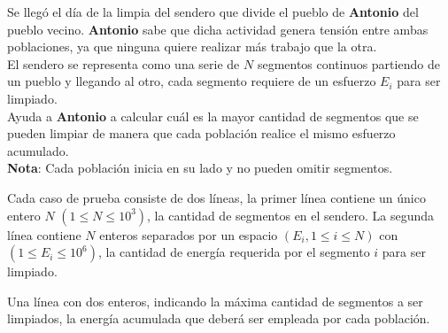 
Se llegó el día de la limpia del sendero que divide el pueblo de \textbf{Antonio} del pueblo vecino. \textbf{Antonio} sabe que dicha actividad genera tensión entre ambas poblaciones, ya que ninguna quiere realizar más trabajo que la otra.
\\
El sendero se representa como una serie de $N$ segmentos continuos partiendo de un pueblo y llegando al otro, cada segmento requiere de un esfuerzo $E_i$ para ser limpiado.
\\
Ayuda a \textbf{Antonio} a calcular cuál es la mayor cantidad de segmentos que se pueden limpiar de manera que cada población realice el mismo esfuerzo acumulado.
\\

\textbf{Nota}: 
Cada población inicia en su lado y no pueden omitir segmentos.


Cada caso de prueba consiste de dos líneas, la primer línea contiene un único entero $N$ $(1 \le N \le 10^3)$, la cantidad de segmentos en el sendero. La segunda línea contiene $N$ enteros separados por un espacio $(E_i, 1\le i \le N)$  con $(1 \le E_i \le 10^6)$, la cantidad de energía requerida por el segmento $i$ para ser limpiado.

\outputText

Una línea con dos enteros, indicando la máxima cantidad de segmentos a ser limpiados, la energía acumulada que deberá ser empleada por cada población.

\exampleCases

\begin{example}
\end{example}

